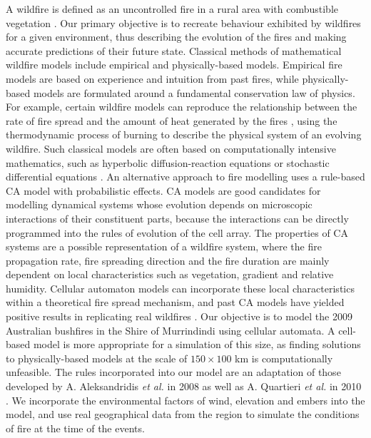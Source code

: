 A wildfire is defined as an uncontrolled fire in a rural area with combustible vegetation \cite{press2008cambridge}. Our primary objective is to recreate behaviour exhibited by wildfires for a given environment, thus describing the evolution of the fires and making accurate predictions of their future state. \newline \indent Classical methods of mathematical wildfire models include empirical and physically-based models. Empirical fire models are based on experience and intuition from past fires, while physically-based models are formulated around a fundamental conservation law of physics. For example, certain wildfire models can reproduce the relationship between the rate of fire spread and the amount of heat generated by the fires \cite{nobel_1980}, using the thermodynamic process of burning to describe the physical system of an evolving wildfire. Such classical models are often based on computationally intensive mathematics, such as hyperbolic diffusion-reaction equations \cite{1997PhRvE..56.6557M} or stochastic differential equations \cite{rothermel1972mathematical}. \newline \indent
An alternative approach to fire modelling uses a rule-based CA model with probabilistic effects. CA models are good candidates for modelling dynamical systems whose evolution depends on microscopic interactions of their constituent parts, because the interactions can be directly programmed into the rules of evolution of the cell array. The properties of CA systems are a possible representation of a wildfire system, where the fire propagation rate, fire spreading direction and the fire duration are mainly dependent on local characteristics such as vegetation, gradient and relative humidity. Cellular automaton models can incorporate these local characteristics within a theoretical fire spread mechanism, and past CA models have yielded positive results in replicating real wildfires \cite{inproceedings}.\newline \indent
Our objective is to model the 2009 Australian bushfires in the Shire of Murrindindi using cellular automata. A cell-based model is more appropriate for a simulation of this size, as finding solutions to physically-based models at the scale of $150 \times 100$ km is computationally unfeasible. The rules incorporated into our model are an adaptation of those developed by A. Aleksandridis \textit{et al.} in 2008 \cite{Aleksandridis_2008} as well as A. Quartieri \textit{et al.} in 2010 \cite{Quartieri_2010}. We incorporate the environmental factors of wind, elevation and embers into the model, and use real geographical data from the region to simulate the conditions of fire at the time of the events.